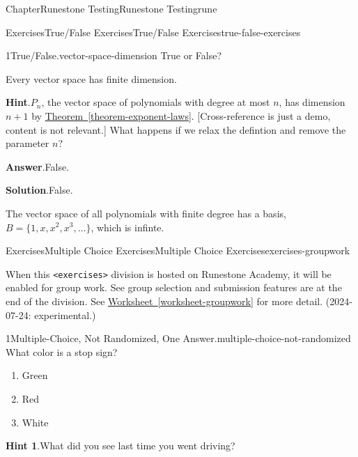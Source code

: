 \documentclass[oneside,10pt,]{book}
\newcommand{\blocktitlefont}{\relax}
\newcommand{\xreffont}{\relax}
\newcommand{\mono}[1]{\texttt{#1}}
\numberwithin{equation}{section}
\begin{document}
\begin{chapterptx}{Chapter}{Runestone Testing}{}{Runestone Testing}{}{}{rune}
\begin{exercises-section}{Exercises}{True\slash{}False Exercises}{}{True\slash{}False Exercises}{}{}{true-false-exercises}
\begin{divisionexercise}{1}{True\slash{}False.}{}{vector-space-dimension}
%
True or False?%
\par
Every vector space has finite dimension.%
\par\smallskip%
\noindent\textbf{\blocktitlefont Hint}.\hypertarget{vector-space-dimension-4}{}\quad{}\(P_n\), the vector space of polynomials with degree at most \(n\), has dimension \(n+1\) by \hyperref[theorem-exponent-laws]{Theorem~{\xreffont\ref{theorem-exponent-laws}}}.  [Cross-reference is just a demo, content is not relevant.]  What happens if we relax the defintion and remove the parameter \(n\)?%
\par\smallskip%
\noindent\textbf{\blocktitlefont Answer}.\hypertarget{vector-space-dimension-5}{}\quad{}False.%
\par\smallskip%
\noindent\textbf{\blocktitlefont Solution}.\hypertarget{vector-space-dimension-6}{}\quad{}False.%
\par
The vector space of all polynomials with finite degree has a basis, \(B = \{1,x,x^2,x^3,\dots\}\), which is infinte.%
\end{divisionexercise}%
\end{exercises-section}
%
%
\typeout{************************************************}
\typeout{************************************************}
%
\begin{exercises-section}{Exercises}{Multiple Choice Exercises}{}{Multiple Choice Exercises}{}{}{exercises-groupwork}
\begin{introduction}{}%
When this \mono{<exercises>} division is hosted on Runestone Academy, it will be enabled for group work.  See group selection and submission features are at the end of the division.  See \hyperref[worksheet-groupwork]{Worksheet~{\xreffont\ref{worksheet-groupwork}}} for more detail.  (2024-07-24: experimental.)%
\end{introduction}%
\begin{divisionexercise}{1}{Multiple-Choice, Not Randomized, One Answer.}{}{multiple-choice-not-randomized}%
%
What color is a stop sign?%
\par
%
\begin{enumerate}[label={\Alph*.}]
\item{}Green%
\item{}Red%
\item{}White%
\end{enumerate}
%
\par\smallskip%
\noindent\textbf{\blocktitlefont Hint 1}.\hypertarget{multiple-choice-not-randomized-4}{}\quad{}What did you see last time you went driving?%

\end{divisionexercise}
\end{exercises-section}
\end{chapterptx}
\end{document}
